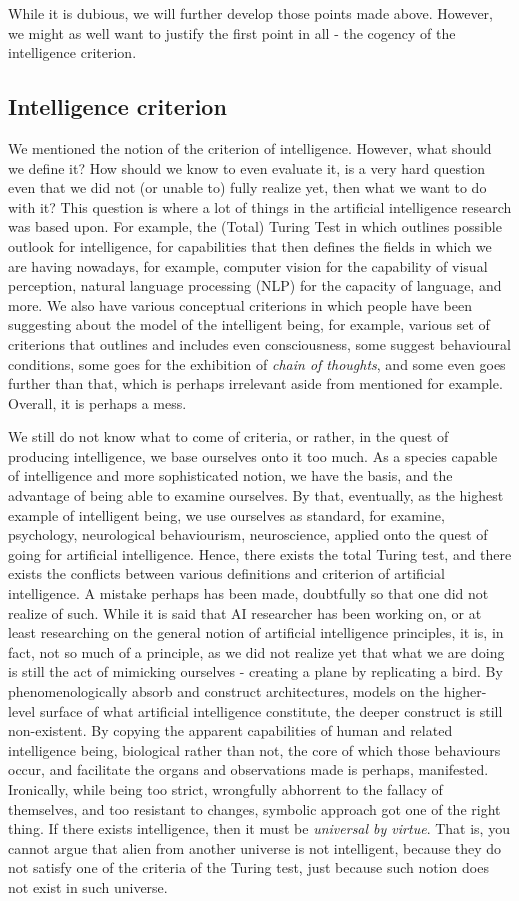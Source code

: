While it is dubious, we will further develop those points made above. However, we might as well want to justify the first point in all - the cogency of the intelligence criterion. 
\subsection{Intelligence criterion}
We mentioned the notion of the criterion of intelligence. However, what should we define it? How should we know to even evaluate it, is a very hard question even that we did not (or unable to) fully realize yet, then what we want to do with it? This question is where a lot of things in the artificial intelligence research was based upon. For example, the (Total) Turing Test in which outlines possible outlook for intelligence, for capabilities that then defines the fields in which we are having nowadays, for example, computer vision for the capability of visual perception, natural language processing (NLP) for the capacity of language, and more. We also have various conceptual criterions in which people have been suggesting about the model of the intelligent being, for example, various set of criterions that outlines and includes even consciousness, some suggest behavioural conditions, some goes for the exhibition of \textit{chain of thoughts}, and some even goes further than that, which is perhaps irrelevant aside from mentioned for example. Overall, it is perhaps a mess. 

We still do not know what to come of criteria, or rather, in the quest of producing intelligence, we base ourselves onto it too much. As a species capable of intelligence and more sophisticated notion, we have the basis, and the advantage of being able to examine ourselves. By that, eventually, as the highest example of intelligent being, we use ourselves as standard, for examine, psychology, neurological behaviourism, neuroscience, applied onto the quest of going for artificial intelligence. Hence, there exists the total Turing test, and there exists the conflicts between various definitions and criterion of artificial intelligence. A mistake perhaps has been made, doubtfully so that one did not realize of such. While it is said that AI researcher has been working on, or at least researching on the general notion of artificial intelligence principles, it is, in fact, not so much of a principle, as we did not realize yet that what we are doing is still the act of mimicking ourselves - creating a plane by replicating a bird. By phenomenologically absorb and construct architectures, models on the higher-level surface of what artificial intelligence constitute, the deeper construct is still non-existent. By copying the apparent capabilities of human and related intelligence being, biological rather than not, the core of which those behaviours occur, and facilitate the organs and observations made is perhaps, manifested. Ironically, while being too strict, wrongfully abhorrent to the fallacy of themselves, and too resistant to changes, symbolic approach got one of the right thing. If there exists intelligence, then it must be \textit{universal by virtue}. That is, you cannot argue that alien from another universe is not intelligent, because they do not satisfy one of the criteria of the Turing test, just because such notion does not exist in such universe. 
